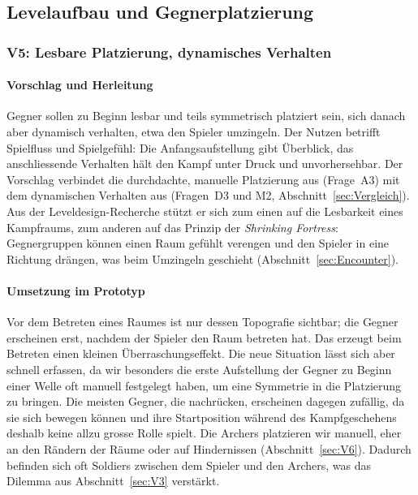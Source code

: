 \documentclass[../Main.tex]{subfiles}
\begin{document}
\subsection{Levelaufbau und Gegnerplatzierung} \label{sec:UmsetzungLevel}

\subsubsection{V5: Lesbare Platzierung, dynamisches Verhalten} \label{sec:V5}

\paragraph{Vorschlag und Herleitung}
Gegner sollen zu Beginn lesbar und teils symmetrisch platziert sein, sich danach aber dynamisch verhalten, etwa den Spieler umzingeln. Der Nutzen betrifft Spielfluss und Spielgefühl: Die Anfangsaufstellung gibt Überblick, das anschliessende Verhalten hält den Kampf unter Druck und unvorhersehbar. Der Vorschlag verbindet die durchdachte, manuelle Platzierung aus  (Frage~A3) mit dem dynamischen Verhalten aus  (Fragen~D3 und M2, Abschnitt~\ref{sec:Vergleich}). Aus der Leveldesign-Recherche stützt er sich zum einen auf die Lesbarkeit eines Kampfraums, zum anderen auf das Prinzip der \textit{Shrinking Fortress}: Gegnergruppen können einen Raum gefühlt verengen und den Spieler in eine Richtung drängen, was beim Umzingeln geschieht (Abschnitt~\ref{sec:Encounter}).

\paragraph{Umsetzung im Prototyp}
Vor dem Betreten eines Raumes ist nur dessen Topografie sichtbar; die Gegner erscheinen erst, nachdem der Spieler den Raum betreten hat. Das erzeugt beim Betreten einen kleinen Überraschungseffekt. Die neue Situation lässt sich aber schnell erfassen, da wir besonders die erste Aufstellung der Gegner zu Beginn einer Welle oft manuell festgelegt haben, um eine Symmetrie in die Platzierung zu bringen. Die meisten Gegner, die nachrücken, erscheinen dagegen zufällig, da sie sich bewegen können und ihre Startposition während des Kampfgeschehens deshalb keine allzu grosse Rolle spielt. Die Archers platzieren wir manuell, eher an den Rändern der Räume oder auf Hindernissen (Abschnitt~\ref{sec:V6}). Dadurch befinden sich oft Soldiers zwischen dem Spieler und den Archers, was das Dilemma aus Abschnitt~\ref{sec:V3} verstärkt.
\end{document}
